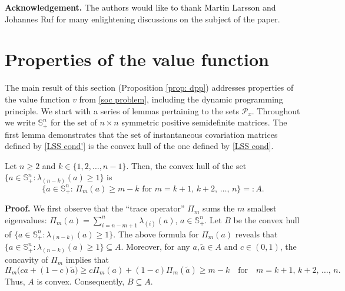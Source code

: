 \documentclass[11pt]{amsart}
\numberwithin{equation}{section}
\begin{document}
\noindent\textbf{Acknowledgement.} The authors would like to thank Martin Larsson and Johannes Ruf for many enlightening discussions on the subject of the paper. 

\section{Properties of the value function} \label{sec2}

The main result of this section (Proposition \ref{prop: dpp}) addresses properties of the value function $v$ from \eqref{soc problem}, including the dynamic programming principle. We start with a series of lemmas pertaining to the sets $\mathcal{P}_x$. Throughout we write $\mathbb{S}^n_+$ for the set of $n\times n$ symmetric positive semidefinite matrices. The first lemma demonstrates that the set of instantaneous covariation matrices defined by \eqref{LSS cond'} is the convex hull of the one defined by \eqref{LSS cond}. 

\begin{lemma} \label{lem: convex hull}
Let $n\ge2$ and $k\in\{1,2,\ldots,n-1\}$. Then, the convex hull of the set $\{a \in \mathbb{S}_+^n \!: \lambda_{(n-k)}(a)\geq 1\}$ is
\begin{equation}
\big\{a \in \mathbb{S}^n_+:\,\Pi_m(a)\geq m-k \text{ for }m=k+1,\, k+2,\,\ldots,\, n \big\}=:A.
\end{equation}
\end{lemma}

\smallskip

\noindent\textbf{Proof.} We first observe that the ``trace operator'' $\Pi_m$
sums the $m$ smallest eigenvalues:
$\Pi_m(a) = \sum_{i=n-m+1}^n \lambda_{(i)}(a)$, $a  \in \mathbb{S}_+^n$. Let $B$ be the convex hull of $\{a \in \mathbb{S}_+^n \!: \lambda_{(n-k)}(a) \geq 1\}$. The above formula for $\Pi_m(a)$ reveals that $\{a \in \mathbb{S}_+^n \!: \lambda_{(n-k)}(a) \geq 1\} \subseteq A$. Moreover, for any $a, \widetilde{a} \in A$ and $c \in (0,1)$,  the concavity of $\Pi_m$ implies that
\begin{equation}
	\Pi_m\big(c a + (1-c) \widetilde{a}\big) \geq c\Pi_m(a) + (1-c) \Pi_m(\widetilde{a}) \geq m-k\quad\text{for}\quad m = k+1,\, k+2,\,\ldots,\, n.
\end{equation}
Thus, $A$ is convex. Consequently, $B\subseteq A$.
	
\medskip
	
\end{document}
